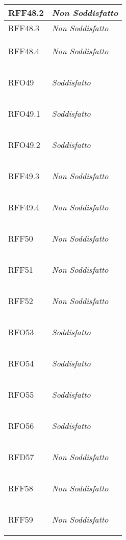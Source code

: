 \begin{longtable}{|>{\centering}m{5cm}|m{5cm}<{\centering}|}
    \hypertarget{RFF48.2}{RFF48.2} & \textit{Non Soddisfatto}\\ \hline
   
    \hypertarget{RFF48.3}{RFF48.3} & \textit{Non Soddisfatto}\\ \hline
   
    \hypertarget{RFF48.4}{RFF48.4} & \textit{Non Soddisfatto}\\ \hline
   
    \hypertarget{RFO49}{RFO49} & \textit{Soddisfatto}\\ \hline
   
    \hypertarget{RFO49.1}{RFO49.1} & \textit{Soddisfatto}\\ \hline
   
    \hypertarget{RFO49.2}{RFO49.2} & \textit{Soddisfatto}\\ \hline
   
    \hypertarget{RFF49.3}{RFF49.3} & \textit{Non Soddisfatto}\\ \hline
   
    \hypertarget{RFF49.4}{RFF49.4} & \textit{Non Soddisfatto}\\ \hline
   
    \hypertarget{RFF50}{RFF50} & \textit{Non Soddisfatto}\\ \hline
   
    \hypertarget{RFF51}{RFF51} & \textit{Non Soddisfatto}\\ \hline
   
    \hypertarget{RFF52}{RFF52} & \textit{Non Soddisfatto}\\ \hline
   
    \hypertarget{RFO53}{RFO53} & \textit{Soddisfatto}\\ \hline
   
    \hypertarget{RFO54}{RFO54} & \textit{Soddisfatto}\\ \hline
   
    \hypertarget{RFO55}{RFO55} & \textit{Soddisfatto}\\ \hline
   
    \hypertarget{RFO56}{RFO56} & \textit{Soddisfatto}\\ \hline
   
    \hypertarget{RFD57}{RFD57} & \textit{Non Soddisfatto}\\ \hline
   
    \hypertarget{RFF58}{RFF58} & \textit{Non Soddisfatto}\\ \hline
   
    \hypertarget{RFF59}{RFF59} & \textit{Non Soddisfatto}\\ \hline
   

\end{longtable}
